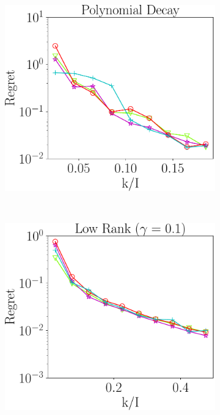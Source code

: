 \begin{figure}
	\begin{subfigure}{0.3\textwidth}
		\includegraphics[scale = 0.25]{figure/fig2_spd_200.pdf}
	\end{subfigure}\\
	\begin{subfigure}{0.3\textwidth}
	\includegraphics[scale = 0.25]{figure/fig2_lk_mnoise_200.pdf}
	\end{subfigure}

\end{figure}
